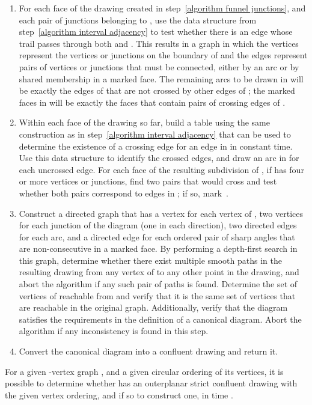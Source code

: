 \documentclass{llncs}
\begin{document}
\begin{enumerate}
\item For each face  of the drawing created in step~\ref{algorithm funnel junctions}, and each pair  of junctions belonging to , use the data structure from step~\ref{algorithm interval adjacency} to test whether there is an edge whose trail passes through both  and . This results in a graph  in which the vertices represent the vertices or junctions on the boundary of  and the edges represent pairs of vertices or junctions that must be connected, either by an arc or by shared membership in a marked face. The remaining arcs to be drawn in  will be exactly the edges of  that are not crossed by other edges of ; the marked faces in  will be exactly the faces that contain pairs of crossing edges of .
\item Within each face  of the drawing so far, build a table using the same construction as in step~\ref{algorithm interval adjacency} that can be used to determine the existence of a crossing edge for an edge in  in constant time. Use this data structure to identify the crossed edges, and draw an arc in  for each uncrossed edge. For each face  of the resulting subdivision of , if  has four or more vertices or junctions, find two pairs that would cross and test whether both pairs correspond to edges in ; if so, mark~.
\item Construct a directed graph that has a vertex for each vertex of , two vertices for each junction of the diagram (one in each direction), two directed edges for each arc, and a directed edge for each ordered pair of sharp angles that are non-consecutive in a marked face. By performing a depth-first search in this graph, determine whether there exist multiple smooth paths in the resulting drawing from any vertex of  to any other point in the drawing, and abort the algorithm if any such pair of paths is found. Determine the set of vertices of  reachable from  and verify that it is the same set of vertices that are reachable in the original graph. Additionally, verify that the diagram satisfies the requirements in the definition of a canonical diagram. Abort the algorithm if any inconsistency is found in this step.
\item Convert the canonical diagram into a confluent drawing and return it.
\end{enumerate}

\begin{theorem}
For a given -vertex graph , and a given circular ordering of its vertices, it is possible to determine whether  has an outerplanar strict confluent drawing with the given vertex ordering, and if so to construct one, in time .
\end{theorem}
\end{document}
